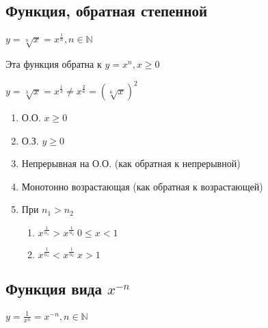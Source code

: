 \documentclass{article}
\begin{document}
    \subsection{Функция, обратная степенной}

    \(y = \sqrt[n]{x} = x^{\frac{1}{n}}, n \in \mathbb{N} \)

    Эта функция обратна к \( y = x^n, x \geq 0 \)

    \( y = \sqrt[3]{x} = x^{\frac{1}{3}} \neq x^{\frac{2}{6}} = (\sqrt[6]{x})^2 \)

    \begin{enumerate}
        \item О.О. \( x \geq 0 \)
        \item О.З. \( y \geq 0 \)
        \item Непрерывная на О.О. (как обратная к непрерывной)
        \item Монотонно возрастающая (как обратная к возрастающей)
        \item При \(n_1 > n_2\)
        \begin{enumerate}
            \item \(x^{\frac{1}{n_1}} > x^{\frac{1}{n_2}}\ 0 \leq x < 1\)
            \item \( x^{\frac{1}{n_1}} < x^{\frac{1}{n_2}}\ x > 1 \)
        \end{enumerate}
    \end{enumerate}

   \subsection{Функция вида \(x^{-n}\)}

    \( y = \frac{1}{x^n} = x^{-n}, n \in \mathbb{N}\)
\end{document}

